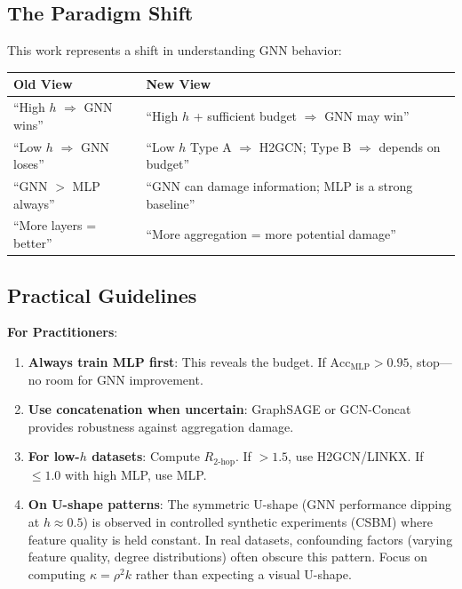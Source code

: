 \subsection{The Paradigm Shift}

This work represents a shift in understanding GNN behavior:

\begin{center}
\begin{tabular}{@{}l|l@{}}
\textbf{Old View} & \textbf{New View} \\
\midrule
``High $h$ $\Rightarrow$ GNN wins'' & ``High $h$ + sufficient budget $\Rightarrow$ GNN may win'' \\
``Low $h$ $\Rightarrow$ GNN loses'' & ``Low $h$ Type A $\Rightarrow$ H2GCN; Type B $\Rightarrow$ depends on budget'' \\
``GNN $>$ MLP always'' & ``GNN can damage information; MLP is a strong baseline'' \\
``More layers = better'' & ``More aggregation = more potential damage'' \\
\end{tabular}
\end{center}

\subsection{Practical Guidelines}

\textbf{For Practitioners}:
\begin{enumerate}
    \item \textbf{Always train MLP first}: This reveals the budget. If $\text{Acc}_{\text{MLP}} > 0.95$, stop---no room for GNN improvement.

    \item \textbf{Use concatenation when uncertain}: GraphSAGE or GCN-Concat provides robustness against aggregation damage.

    \item \textbf{For low-$h$ datasets}: Compute $R_{2\text{-hop}}$. If $> 1.5$, use H2GCN/LINKX. If $\leq 1.0$ with high MLP, use MLP.

    \item \textbf{On U-shape patterns}: The symmetric U-shape (GNN performance dipping at $h \approx 0.5$) is observed in controlled synthetic experiments (CSBM) where feature quality is held constant. In real datasets, confounding factors (varying feature quality, degree distributions) often obscure this pattern. Focus on computing $\kappa = \rho^2 k$ rather than expecting a visual U-shape.
\end{enumerate}


